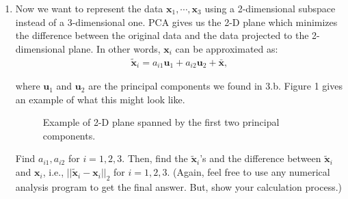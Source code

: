 \documentclass[a3paper,12pt]{extarticle} %
\begin{document}
\begin{enumerate}
\item
Now we want to represent the data $\mathbf{x}_1, \cdots, \mathbf{x}_3$ using a 2-dimensional subspace instead of a 3-dimensional one. PCA gives us the 2-D plane which minimizes the difference between the original data and the data projected to the 2-dimensional plane. In other words, $\mathbf{x}_i$ can be approximated as:
\begin{align}
\tilde{\mathbf{x}}_i = a_{i1}\mathbf{u}_1 + a_{i2}\mathbf{u}_2 + \bar{\mathbf{x}},
\end{align}

where $\mathbf{u}_1$ and $\mathbf{u}_2$ are the principal components we found in 3.b. Figure 1 gives an example of what this might look like.

\begin{figure}[h]
\centering
\caption{Example of 2-D plane spanned by the first two principal components.}
\end{figure}

Find $a_{i1}, a_{i2}$ for $i = 1, 2, 3$. Then, find the $\tilde{\mathbf{x}}_i$'s and the difference between $\tilde{\mathbf{x}}_i$ and $\mathbf{x}_i$, i.e., $||\tilde{\mathbf{x}}_i - \mathbf{x}_i||_2$ for $i = 1, 2, 3$. (Again, feel free to use any numerical analysis program to get the final answer. But, show your calculation process.)

\end{enumerate}
\end{document}
